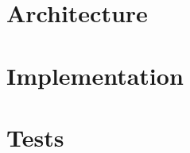\documentclass[a4paper, 11pt]{memoir}
\begin{document}
\chapter{Architecture}

\chapter{Implementation}

\chapter{Tests}

\backmatter




\listoffigures
\end{document}
